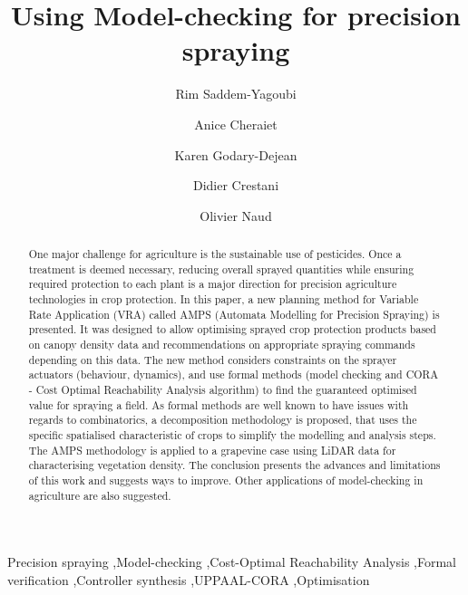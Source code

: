 \documentclass[preprint,3p,times,twocolumn]{elsarticle}
\begin{document}
\linenumbers
\begin{frontmatter}
\title{Using Model-checking for precision spraying}


\author[inst1]{Rim Saddem-Yagoubi}
\author[inst3]{Anice Cheraiet}

\author[inst2]{Karen Godary-Dejean}
\author[inst2]{Didier Crestani}
\author[inst3]{Olivier Naud}


         
\begin{abstract}
	One major challenge for agriculture is the sustainable use of pesticides. Once a treatment is deemed necessary, reducing overall sprayed quantities while ensuring required protection to each plant is a major direction for precision agriculture technologies in crop protection. In this paper, a new planning method for Variable Rate Application (VRA) called AMPS (Automata Modelling for Precision Spraying) is presented. It was designed to allow optimising sprayed crop protection products based on canopy density data and recommendations on appropriate spraying commands depending on this data. The new method considers constraints on the sprayer actuators (behaviour, dynamics), and use formal methods (model checking and CORA - Cost Optimal Reachability Analysis algorithm) to find the guaranteed optimised value for spraying a field. As formal methods are well known to have issues with regards to combinatorics, a decomposition methodology is proposed, that uses the specific spatialised characteristic of crops to simplify the modelling and analysis steps. The AMPS methodology is applied to a grapevine case using LiDAR data for characterising vegetation density.  The conclusion presents the advances and limitations of this work and suggests ways to improve. Other applications of model-checking in agriculture are also suggested.
\end{abstract}

\begin{keyword}
	
	Precision spraying \sep Model-checking \sep Cost-Optimal Reachability Analysis   \sep Formal verification \sep Controller
	synthesis  \sep   UPPAAL-CORA  \sep  Optimisation 
\end{keyword}

\end{frontmatter}
\end{document}
